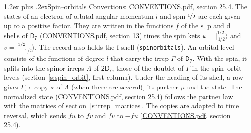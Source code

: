 \documentclass[10pt,a4paper]{article}
\makeatletter
\renewcommand\section{\@startsection{section}{1}{\z@}{-3ex plus -1ex minus -.2ex}%
  {1.2ex plus .2ex}{\normalfont\large\sffamily\bfseries\color{parttitle}}}
\numberwithin{equation}{section}
\newcommand{\grp}[1]{\mathsf{#1}}
\newcommand{\orbital}[1]{\mathrm{#1}}
\newcommand{\mult}{\kappa}
\newcommand{\intx}{\mu}
\newcommand{\jm}[2]{\bigl\lvert{}^{#1}_{\,#2}\bigr\rangle}
\makeatother
\begin{document}
\section{Spin--orbitals}\label{s:spin_orbitals}
Conventions: \href{../../CONVENTIONS.pdf}{CONVENTIONS.pdf}, section \href{../../CONVENTIONS.pdf\#conv.25.4}{25.4}.
\leavevmode\label{n:index.orbital.l}The states of an electron of orbital angular momentum $l$ and spin $\nicefrac{1}{2}$ are each given up to a positive factor. \label{n:local.spinor.uv}\label{n:local.function.f}They are written in the functions $f$ of the $\orbital{s}$, $\orbital{p}$ and $\orbital{d}$ shells of \href{../../../rotation/data/pdf/D7.pdf}{$\grp{D_{7}}$} (\href{../../CONVENTIONS.pdf}{CONVENTIONS.pdf}, section \href{../../../rotation/CONVENTIONS.pdf\#conv.13}{13}) times the spin kets $u = \jm{1/2}{1/2}$ and $v = \jm{1/2}{-1/2}$. The record also holds the $\orbital{f}$ shell (\texttt{spinorbitals}). An orbital level consists of the functions of degree $l$ that carry the irrep $\Gamma$ of \href{../../../rotation/data/pdf/D7.pdf}{$\grp{D_{7}}$}. With the spin, it splits into the spinor irreps $\Lambda$ of $\grp{2D_{7}}$, those of the doublet of $\Gamma$ in the spin--orbit levels (section~\ref{s:spin_orbit}, first column). \label{n:head.state}Under the heading of its shell, a row gives $\Gamma$, a copy $\mult$ of $\Lambda$ (when there are several), its partner $\intx$ and the state. The normalized state (\href{../../CONVENTIONS.pdf}{CONVENTIONS.pdf}, section \href{../../CONVENTIONS.pdf\#conv.25.4}{25.4}) follows the partner law with the matrices of section~\ref{s:irrep_matrices}. The copies are adapted to time reversal, which sends $f u$ to $f v$ and $f v$ to $-f u$ (\href{../../CONVENTIONS.pdf}{CONVENTIONS.pdf}, section \href{../../CONVENTIONS.pdf\#conv.25.4}{25.4}).
\end{document}
